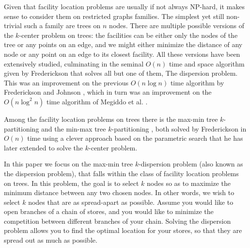 \documentclass[11pt,a4paper]{article}
\newcommand{\Oh}{{O}}
\theoremstyle{definition}
\theoremstyle{remark}
\begin{document}
Given that facility location problems are usually if not always NP-hard, it makes sense to consider them on restricted graphs families. The simplest yet still non-trivial such a family are trees on $n$ nodes. There are multiple possible versions of the $k$-center problem on trees: the facilities can be either only the nodes of the tree or any points on an edge, and we might either minimize the distance of any node or any point on an edge to its closest facility. All these versions have been extensively studied, culminating in the seminal $\Oh(n)$ time and space algorithm given by Frederickson \cite{Frederickson1991a} that solves all but one of them, The dispersion problem. This was an improvement on the previous $\Oh(n\log n)$ time algorithm by Frederickson and Johnson \cite{Frederickson1983}, which in turn was an improvement on the $\Oh(n\log^2n)$ time algorithm of Megiddo et al. \cite{Megiddo1981}. 

Among the facility location problems on trees there is the max-min tree $k$-partitioning \cite{Perl1981} and the min-max tree $k$-partitioning \cite{Becker1982}, both solved by Frederickson in $\Oh(n)$ time
\cite{Frederickson1991} using a clever approach based on the parametric search that he has later extended to solve the $k$-center problem.

In this paper we focus on the max-min tree $k$-dispersion problem (also known as the dispersion problem), that falls within the class of facility location problems on trees. In this problem, the goal is to select $k$ nodes so as to maximize the minimum distance between any two chosen nodes. In other words, we wish to select $k$ nodes that are as spread-apart as possible. Assume you would like to open branches of a chain of stores, and you would like to minimize the competition between different branches of your chain. Solving the dispersion problem allows you to find the optimal location for your stores, so that they are spread out as much as possible.
\end{document}

